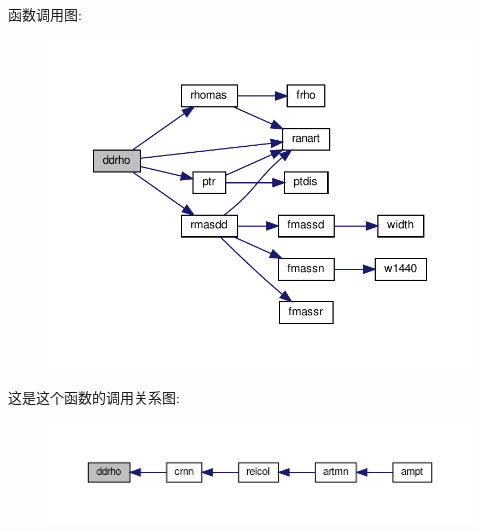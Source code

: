 函数调用图\+:
\nopagebreak
\begin{figure}[H]
\begin{center}
\leavevmode
\includegraphics[width=350pt]{ddrho_8f90_ac4d063e7ac9b1c02dcc08327ff355246_cgraph}
\end{center}
\end{figure}
这是这个函数的调用关系图\+:
\nopagebreak
\begin{figure}[H]
\begin{center}
\leavevmode
\includegraphics[width=350pt]{ddrho_8f90_ac4d063e7ac9b1c02dcc08327ff355246_icgraph}
\end{center}
\end{figure}

